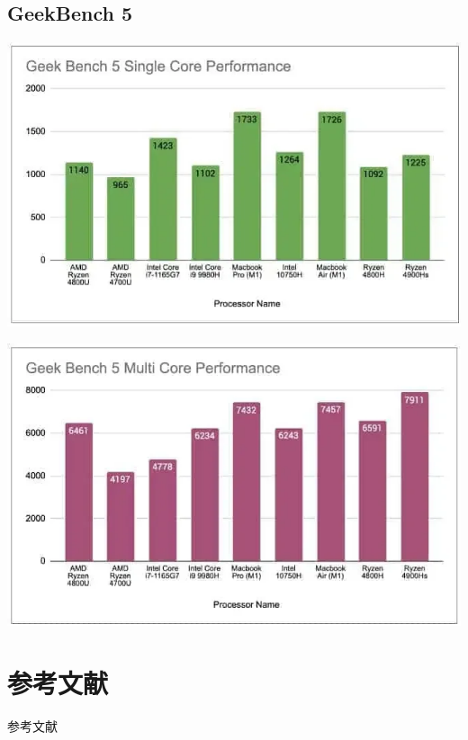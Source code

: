 \documentclass[a4paper]{article}
\begin{document}
\subsection{GeekBench 5}

\includegraphics[width=\textwidth]{Geekbench-5-Single-Core.png}

\includegraphics[width=\textwidth]{Geekbench5-Multicore.png}

\section{参考文献}
参考文献\cite{quinn1994parallel}\cite{golub2014scientific}\cite{joseph2022parallel}

\newpage


\end{document}
